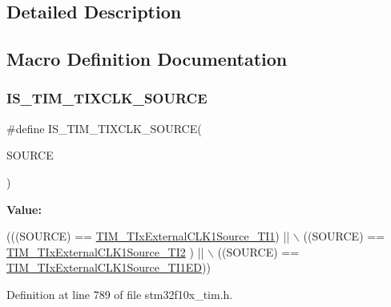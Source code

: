 \subsection{Detailed Description}


\subsection{Macro Definition Documentation}
\mbox{\label{group___t_i_m___t_ix___external___clock___source_gabfa9cd6cf6e9df4bff8d6cdf16c6b374}} 
\subsubsection{\texorpdfstring{I\+S\+\_\+\+T\+I\+M\+\_\+\+T\+I\+X\+C\+L\+K\+\_\+\+S\+O\+U\+R\+CE}{IS\_TIM\_TIXCLK\_SOURCE}}
{\footnotesize\ttfamily \#define I\+S\+\_\+\+T\+I\+M\+\_\+\+T\+I\+X\+C\+L\+K\+\_\+\+S\+O\+U\+R\+CE(\begin{DoxyParamCaption}\item[{}]{S\+O\+U\+R\+CE }\end{DoxyParamCaption})}

{\bfseries Value\+:}
\begin{DoxyCode}
(((SOURCE) == \hyperlink{group___t_i_m___t_ix___external___clock___source_ga237daecde6e1f75509acc80a9ccce820}{TIM\_TIxExternalCLK1Source\_TI1}) || \(\backslash\)
                                      ((SOURCE) == \hyperlink{group___t_i_m___t_ix___external___clock___source_gafa3c6345a7e1c3668b2e7e4d61a79491}{TIM\_TIxExternalCLK1Source\_TI2}
      ) || \(\backslash\)
                                      ((SOURCE) == 
      \hyperlink{group___t_i_m___t_ix___external___clock___source_gaa1a749bc38d434902b69a45d50ee0889}{TIM\_TIxExternalCLK1Source\_TI1ED}))
\end{DoxyCode}


Definition at line 789 of file stm32f10x\+\_\+tim.\+h.


